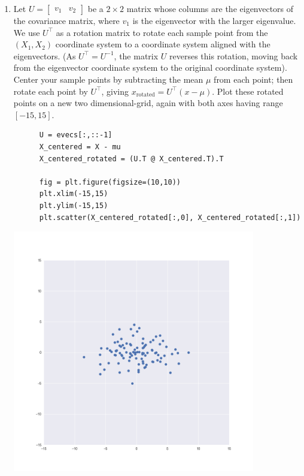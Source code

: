 \documentclass{article}
\begin{document}
\begin{enumerate}[label=(\alph*)]
\newpage
\item Let $U = \begin{bmatrix} v_1 & v_2 \end{bmatrix}$ be a $2 \times 2$
  matrix whose columns are the eigenvectors of the covariance matrix, where
  $v_1$ is the eigenvector with the larger eigenvalue. We use $U^{\top}$ as a
  rotation matrix to rotate each sample point from the $(X_1, X_2)$ coordinate
  system to a coordinate system aligned with the eigenvectors. (As
  $U^{\top} = U^{-1}$, the matrix $U$ reverses this rotation, moving back from
  the eigenvector coordinate system to the original coordinate system). Center
  your sample points by subtracting the mean $\mu$ from each point; then rotate
  each point by $U^{\top}$, giving $x_{\text{rotated}} = U^{\top}(x - \mu)$.
  Plot these rotated points on a new two dimensional-grid, again with both axes
  having range $[-15, 15]$.
  \begin{mdframed}
    \begin{verbatim}
      U = evecs[:,::-1]
      X_centered = X - mu
      X_centered_rotated = (U.T @ X_centered.T).T

      fig = plt.figure(figsize=(10,10))
      plt.xlim(-15,15)
      plt.ylim(-15,15)
      plt.scatter(X_centered_rotated[:,0], X_centered_rotated[:,1])
    \end{verbatim}
    \includegraphics[width=300pt]{img/hw03_3e.png}
  \end{mdframed}

\end{enumerate}
\end{document}
